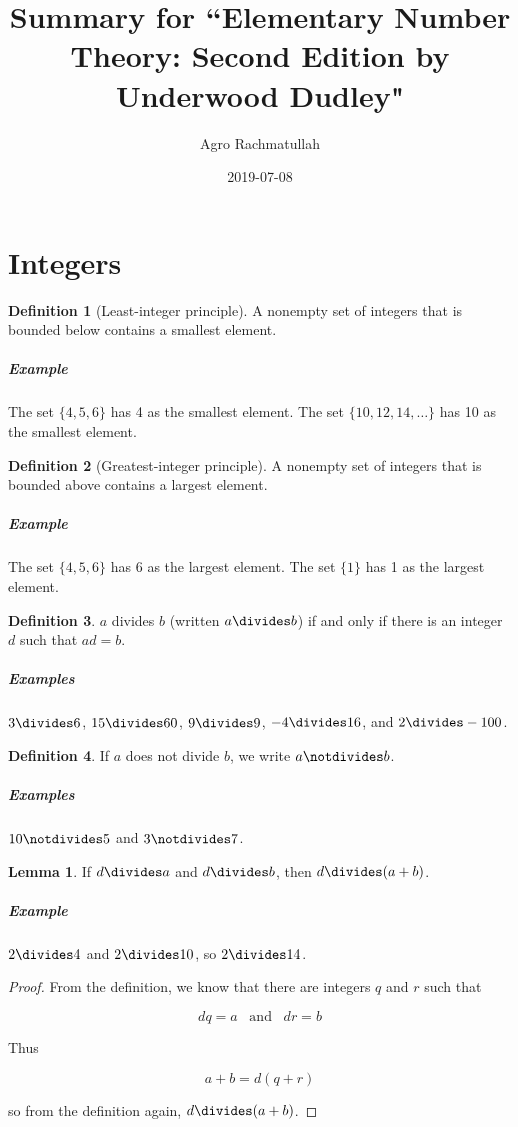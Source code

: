 \documentclass{article}
\title{Summary for ``Elementary Number Theory: Second Edition by Underwood Dudley"}
\date{2019-07-08}
\author{Agro Rachmatullah}
\theoremstyle{definition} %
\theoremstyle{definition}
\theoremstyle{definition}
\newtheorem{lemma}{Lemma}[section]
\theoremstyle{definition}
\newtheorem{definition}{Definition}[section]
\begin{document}
  \maketitle
  
  \newpage
  \section{Integers}
  
  \begin{definition}[Least-integer principle]
  A nonempty set of integers that is bounded below contains a smallest element.
  \end{definition}
  
  \subparagraph{Example} The set $\{4, 5, 6\}$ has 4 as the smallest element. The set $\{10, 12, 14, \dots\}$ has 10 as the smallest element.
  
  \begin{definition}[Greatest-integer principle]
  A nonempty set of integers that is bounded above contains a largest element.
  \end{definition}
  
  \subparagraph{Example} The set $\{4, 5, 6\}$ has 6 as the largest element. The set $\{1\}$ has 1 as the largest element.
  
  \begin{definition}
  $a$ divides $b$ (written $a \divides b$) if and only if there is an integer $d$ such that $ad = b$.
  
  \subparagraph{Examples} $3 \divides 6$, $15 \divides 60$, $9 \divides 9$, $-4 \divides 16$, and $2 \divides -100$.
  \end{definition}
  
  \begin{definition}
  If $a$ does not divide $b$, we write $a \notdivides b$.
  
  \subparagraph{Examples} $10 \notdivides 5$ and $3 \notdivides 7$.
  \end{definition}
  
  \begin{lemma}
    If $d \divides a$ and $d \divides b$, then $d \divides (a + b)$.
  \end{lemma}
  
  \subparagraph{Example} $2 \divides 4$ and $2 \divides 10$, so $2 \divides 14$.
  
  \begin{proof}
    From the definition, we know that there are integers $q$ and $r$ such that
    
    \[ dq = a \;\;\;\text{and}\;\;\; dr = b \]
    
    Thus
    
    \[ a + b = d(q + r) \]
    
    so from the definition again, $d \divides (a + b)$.
  \end{proof}
  
\end{document}
